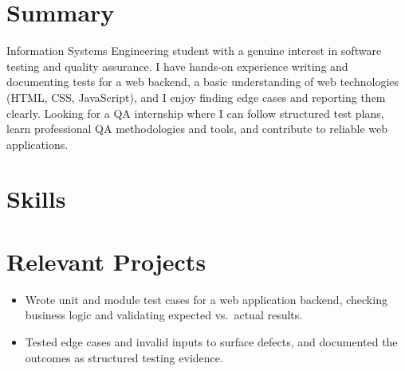 \documentclass[11pt]{article}
\begin{document}

\section{Summary}
Information Systems Engineering student with a genuine interest in software testing and
quality assurance. I have hands-on experience writing and documenting tests for a web
backend, a basic understanding of web technologies (HTML, CSS, JavaScript), and I enjoy
finding edge cases and reporting them clearly. Looking for a QA internship where I can
follow structured test plans, learn professional QA methodologies and tools, and contribute
to reliable web applications.

\section{Skills}

\section{Relevant Projects}

\begin{itemize}
  \item Wrote unit and module test cases for a web application backend, checking business logic and validating expected vs.\ actual results.
  \item Tested edge cases and invalid inputs to surface defects, and documented the outcomes as structured testing evidence.
\end{itemize}
\end{document}
